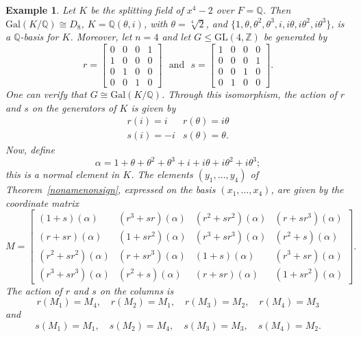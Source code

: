 \documentclass[12pt]{article}
\theoremstyle{plain}
\newtheorem{example}[theorem]{Example}
\newcommand{\Z}{\ensuremath{\mathbb{Z}}}
\newcommand{\Q}{\ensuremath{\mathbb{Q}}}
\begin{document}
\begin{example}
Let $K$ be the splitting field of $x^4-2$ over $F=\Q$. Then
$\mathrm{Gal}(K/\Q) \cong D_8$, $K = \Q(\theta,i)$, with $\theta =
\sqrt[4]{2}$, and $\lbrace 1, \theta, \theta^2, \theta^3, i, i\theta,
i\theta^2, i\theta^3\rbrace$, is a $\Q$-basis for $K$. Moreover, let
$n=4$ and let
$G\leq \mathrm{GL}(4,\Z)$ be generated by
$$
r = \begin{bmatrix}
0&0&0&1\\
1&0&0&0\\
0&1&0&0\\
0&0&1&0
\end{bmatrix} \,\,\,\, \text{and}\,\,\,\,
s = \begin{bmatrix}
1&0&0&0\\
0&0&0&1\\
0&0&1&0\\
0&1&0&0
\end{bmatrix}.
$$ One can verify that $G \cong \mathrm{Gal}(K/\Q)$. Through this isomorphism, the
action of $r$ and $s$ on the generators of $K$ is given by
$$
\begin{matrix}
r(i) = i &r(\theta) = i \theta \\
s(i) = -i & s(\theta) = \theta.
\end{matrix}
$$
Now, define $$\alpha = 1+ \theta + \theta^2 + \theta^3 +i + i\theta + i\theta^2 + i\theta^3;$$
this is a normal element in $K$. 
The elements $(y_1,\dots,y_4)$ of Theorem~\ref{nonamenonsign}, expressed 
on the basis $(x_1,\dots,x_4)$, are given by the coordinate matrix
$$
M= \begin{bmatrix}
(1+s)(\alpha) & (r^3+sr)(\alpha) & (r^2+sr^2)(\alpha) & (r+sr^3)(\alpha)\\
(r+sr)(\alpha) & (1+sr^2)(\alpha) & (r^3+sr^3)(\alpha) & (r^2+s)(\alpha)\\
(r^2+sr^2)(\alpha) & (r+sr^3)(\alpha) & (1+s)(\alpha) & (r^3+sr)(\alpha)\\
(r^3+sr^3)(\alpha) & (r^2+s)(\alpha) & (r+sr)(\alpha) & (1+sr^2)(\alpha)
\end{bmatrix}.
$$
The action of $r$ and $s$ on the columns is
$$r(M_1)=M_4,\quad r(M_2)=M_1,\quad r(M_3)=M_2, \quad r(M_4)=M_3$$
and
$$s(M_1)=M_1,\quad s(M_2)=M_4,\quad s(M_3)=M_3, \quad s(M_4)=M_2.$$
\end{example} 
\end{document}
